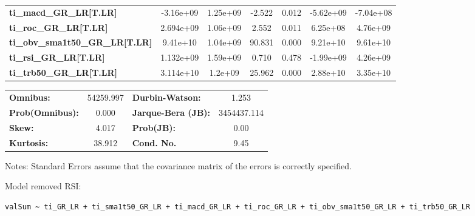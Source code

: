 \begin{center}
\begin{tabular}{lcccccc}
\textbf{ti\_macd\_GR\_LR[T.LR]}         &    -3.16e+09  &     1.25e+09     &    -2.522  &         0.012        &    -5.62e+09    &    -7.04e+08     \\
\textbf{ti\_roc\_GR\_LR[T.LR]}          &    2.694e+09  &     1.06e+09     &     2.552  &         0.011        &     6.25e+08    &     4.76e+09     \\
\textbf{ti\_obv\_sma1t50\_GR\_LR[T.LR]} &     9.41e+10  &     1.04e+09     &    90.831  &         0.000        &     9.21e+10    &     9.61e+10     \\
\textbf{ti\_rsi\_GR\_LR[T.LR]}          &    1.132e+09  &     1.59e+09     &     0.710  &         0.478        &    -1.99e+09    &     4.26e+09     \\
\textbf{ti\_trb50\_GR\_LR[T.LR]}        &    3.114e+10  &      1.2e+09     &    25.962  &         0.000        &     2.88e+10    &     3.35e+10     \\
\bottomrule
\end{tabular}
\begin{tabular}{lclc}
\textbf{Omnibus:}       & 54259.997 & \textbf{  Durbin-Watson:     } &      1.253   \\
\textbf{Prob(Omnibus):} &    0.000  & \textbf{  Jarque-Bera (JB):  } & 3454437.114  \\
\textbf{Skew:}          &    4.017  & \textbf{  Prob(JB):          } &       0.00   \\
\textbf{Kurtosis:}      &   38.912  & \textbf{  Cond. No.          } &       9.45   \\
\bottomrule
\end{tabular}
\end{center}

Notes: \newline
 [1] Standard Errors assume that the covariance matrix of the errors is correctly specified.

Model removed RSI: \begin{verbatim}valSum ~ ti_GR_LR + ti_sma1t50_GR_LR + ti_macd_GR_LR + ti_roc_GR_LR + ti_obv_sma1t50_GR_LR + ti_trb50_GR_LR\end{verbatim}

